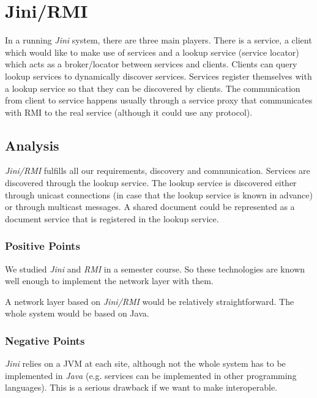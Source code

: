 \section{Jini/RMI}
\label{sect:jini}

In a running \emph{Jini} system, there are three main players. There is a service, a client which would like to make use of services and a lookup service (service locator) which acts as a broker/locator between services and clients. Clients can query lookup services to dynamically discover services. Services register themselves with a lookup service so that they can be discovered by clients. The communication from client to service happens usually through a service proxy that communicates with RMI to the real service (although it could use any protocol).


\subsection{Analysis}
\emph{Jini/RMI} fulfills all our requirements, discovery and communication. Services are discovered through the lookup service. The lookup service is discovered either through unicast connections (in case that the lookup service is known in advance) or through multicast messages. A shared document could be represented as a document service that is registered in the lookup service.

\subsubsection{Positive Points}
We studied \emph{Jini} and \emph{RMI} in a semester course. So these technologies are known well enough to implement the network layer with them.

A network layer based on \emph{Jini/RMI} would be relatively straightforward. The whole system would be based on Java.

\subsubsection{Negative Points}
\emph{Jini} relies on a JVM at each site, although not the whole system has to be implemented in \emph{Java} (e.g. services can be implemented in other programming languages). This is a serious drawback if we want to make \ace interoperable.

